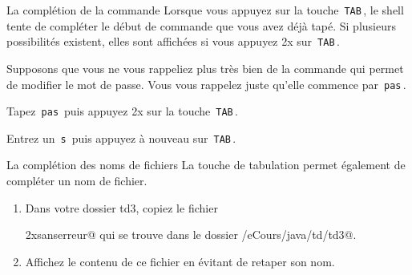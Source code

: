 \documentclass[a4paper,11pt]{article}
\begin{document}
			
		\begin{Tutoriel}{La compl\'etion de la commande} 
	          	Lorsque vous appuyez sur la touche \,\verb|TAB|\,, le shell tente de compl\'eter le d\'ebut de commande que vous avez d\'ej\`a tap\'e. 
			Si plusieurs possibilit\'es existent, elles sont affich\'ees si vous appuyez 2x sur  \,\verb|TAB|\,.  
        
            	\par
        		          Supposons que vous ne vous rappeliez plus tr\`es bien de la commande qui permet de modifier le mot de passe.
		          Vous vous rappelez juste qu'elle commence par \,\verb|pas|\,.  
        
            		\par
        
			\begin{steps}
				\item Tapez \,\verb|pas|\, puis appuyez 2x sur la touche \,\verb|TAB|\,.
				\item Entrez un \,\verb|s|\, puis appuyez \`a nouveau sur \,\verb|TAB|\,.
          		\end{steps}
		
		\end{Tutoriel}		
			
		\begin{Exercice}{La compl\'etion des noms de fichiers} 
		          La touche de tabulation permet \'egalement de compl\'eter un nom de fichier. 
			\begin{enumerate}
				\item Dans votre dossier td3, copiez le fichier \par
					\verb@monfichieraunomtellementlongquilmeparaitpeuprobabledeletaper2xsanserreur@ 
					qui se trouve dans le dossier \verb@/eCours/java/td/td3@.
          			\item Affichez le contenu de ce fichier en \'evitant de retaper son nom.
			\end{enumerate}
		\end{Exercice}	
		
\end{document}
